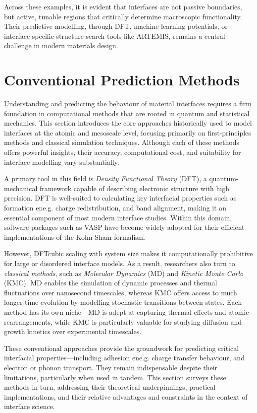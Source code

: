 Across these examples, it is evident that interfaces are not passive boundaries, but active, tunable  regions that critically determine macroscopic functionality. Their predictive modelling, through DFT, machine learning potentials, or interface-specific structure search tools like ARTEMIS, remains a central challenge in modern materials design.

\section{Conventional Prediction Methods} \label{section:conventional_methods}

Understanding and predicting the behaviour of material interfaces requires a firm foundation in computational methods that are rooted in quantum and statistical mechanics. This section introduces the core approaches historically used to model interfaces at the atomic and mesoscale level, focusing primarily on first-principles methods and classical simulation techniques. Although each of these methods offers powerful insights, their accuracy, computational cost, and suitability for interface modelling vary substantially.

A primary tool in this field is \textit{Density Functional Theory} (DFT), a quantum-mechanical framework capable of describing electronic structure with high precision. DFT is well-suited to calculating key interfacial properties such as formation ene.g. charge redistribution, and band alignment, making it an essential component of most modern interface studies. Within this domain, software packages such as \textsc{VASP} have become widely adopted for their efficient implementations of the Kohn-Sham formalism.

However, DFT\rqss cubic scaling with system size makes it computationally prohibitive for large or disordered interface models. As a result, researchers also turn to \textit{classical methods}, such as \textit{Molecular Dynamics} (MD) and \textit{Kinetic Monte Carlo} (KMC). MD enables the simulation of dynamic processes and thermal fluctuations over nanosecond timescales, whereas KMC offers access to much longer time evolution by modelling stochastic transitions between states. Each method has its own niche---MD is adept at capturing thermal effects and atomic rearrangements, while KMC is particularly valuable for studying diffusion and growth kinetics over experimental timescales.

These conventional approaches provide the groundwork for predicting critical interfacial properties---including adhesion ene.g. charge transfer behaviour, and electron or phonon transport. They remain indispensable despite their limitations, particularly when used in tandem. This section surveys these methods in turn, addressing their theoretical underpinnings, practical implementations, and their relative advantages and constraints in the context of interface science.

